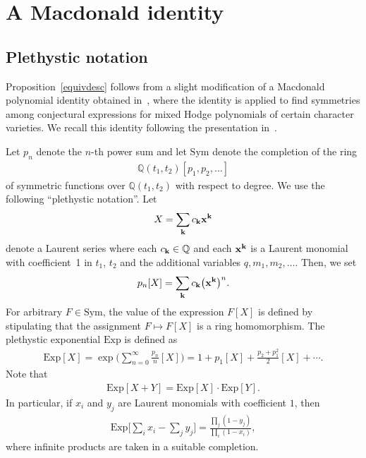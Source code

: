 \documentclass[10pt,a4paper]{amsart}
\numberwithin{equation}{section}
\newcommand{\Sym}{\mathrm{Sym}}
\newcommand{\Exp}{\mathrm{Exp}}
\def\Q{\mathbb Q}
\begin{document}
\section{A Macdonald identity}\label{equivproof}


\subsection{Plethystic notation}\label{Macdonald}


Proposition~\ref{equivdesc} follows from a slight modification of a Macdonald polynomial identity obtained in~\cite[Section~7]{M}, where the identity is applied to find symmetries among conjectural expressions for mixed Hodge polynomials of certain character varieties. We recall this identity following the presentation in~\cite{M}.

Let $p_n$ denote the $n$-th power sum and let $\Sym$ denote the completion of the ring
\begin{gather*}
\Q(t_1,t_2)[p_1,p_2,\ldots]
\end{gather*}
of symmetric functions over $\Q(t_1,t_2)$ with respect to degree. We use the following ``plethystic notation''. Let
\begin{gather*}
X=\sum_{{\bf k}} c_{\bf k} {\bf x}^{\bf k}
\end{gather*}
denote a Laurent series where each $c_{\bf k}\in \Q$ and each ${\bf x}^{\bf k}$ is a Laurent monomial with coefficient~1 in $t_1$, $t_2$ and the additional variables $q, m_1,m_2,\dots$. Then, we set
\begin{gather*}
p_n[X]=\sum_{{\bf k}} c_{\bf k} \big({\bf x}^{\bf k}\big)^n.
\end{gather*}
For arbitrary $F\in \Sym$, the value of the expression $F[X]$ is defined by stipulating that the assignment $F\mapsto F[X]$ is a ring homomorphism. The plethystic exponential $\Exp$ is defined as \begin{align}\label{expdef}
\Exp[X]=\exp\bigg(\sum_{n=0}^{\infty} \frac{p_n}{n}[X]\bigg)=1+p_1[X]+\frac{p_2+p_1^2}{2}[X]+\cdots.
\end{align}
Note that
\begin{gather*}
\Exp[X+Y]=\Exp[X]\cdot \Exp[Y].
\end{gather*}
In particular, if $x_i$ and $y_j$ are Laurent monomials with coefficient $1$, then
\begin{gather*}
\Exp\bigg[\sum_{i} x_i-\sum_{j} y_j \bigg]= \frac{\prod_{j}(1-y_j)}{\prod_{i}(1-x_i)},
\end{gather*}
where infinite products are taken in a suitable completion.
\end{document}
